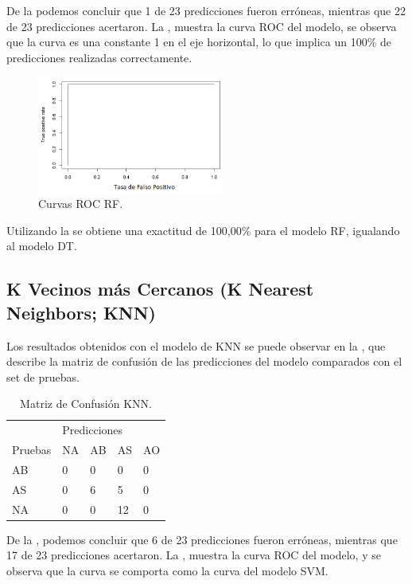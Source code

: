 \documentclass[spanish]{textolivre}
\begin{document}
De la  podemos concluir que 1 de 23 predicciones fueron erróneas, mientras que 22 de 23 predicciones acertaron. La , muestra la curva ROC del modelo, se observa que la curva es una constante 1 en el eje horizontal, lo que implica un 100\% de predicciones realizadas correctamente.

\begin{figure}[htbp]
 \centering
 \includegraphics[width=0.55\textwidth]{figura12.png}
 \caption{Curvas ROC RF.}
 \label{figura12}
\end{figure}

Utilizando la  se obtiene una exactitud de 100,00\% para el modelo RF, igualando al modelo DT.

\subsection{K Vecinos más Cercanos (K Nearest Neighbors; KNN)}
Los resultados obtenidos con el modelo de KNN  se puede observar en la , que describe la matriz de confusión de las predicciones del modelo comparados con el set de pruebas.

\begin{table}[htpb]
\centering
\caption{Matriz de Confusión KNN.}
\label{tab8}
\begin{tabular}{lllll}
\toprule 
 & \multicolumn{4}{l}{Predicciones}   \\ 
\cmidrule{2-5}
Pruebas        & NA      & AB       & AS       & AO
\\ 
\midrule
AB             & 0       & 0        & 0        & 0
\\ 
AS             & 0       & 6        & 5        & 0
\\
NA             & 0       & 0        & 12       & 0
\\
\bottomrule
\end{tabular}
\end{table}

De la ,  podemos concluir que 6 de 23 predicciones fueron erróneas, mientras que 17 de 23 predicciones acertaron. La , muestra la curva ROC del modelo, y se observa que la curva se comporta como la curva del modelo SVM.
\end{document}
